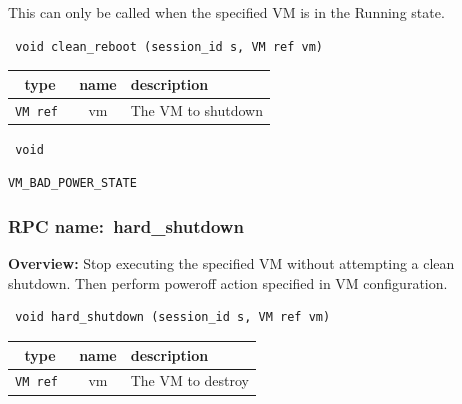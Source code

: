 This can only be called when the specified VM is in the Running state.

\begin{verbatim} void clean_reboot (session_id s, VM ref vm)\end{verbatim}



 
\vspace{0.3cm}
\begin{tabular}{|c|c|p{7cm}|}
 \hline
{\bf type} & {\bf name} & {\bf description} \\ \hline
{\tt VM ref } & vm & The VM to shutdown \\ \hline 

\end{tabular}

\vspace{0.3cm}

{\tt 
void
}



\vspace{0.3cm}

 {\tt VM\_BAD\_POWER\_STATE}

\vspace{0.6cm}
\subsubsection{RPC name:~hard\_shutdown}

{\bf Overview:} 
Stop executing the specified VM without attempting a clean shutdown. Then
perform poweroff action specified in VM configuration.

\begin{verbatim} void hard_shutdown (session_id s, VM ref vm)\end{verbatim}



 
\vspace{0.3cm}
\begin{tabular}{|c|c|p{7cm}|}
 \hline
{\bf type} & {\bf name} & {\bf description} \\ \hline
{\tt VM ref } & vm & The VM to destroy \\ \hline 

\end{tabular}

\vspace{0.3cm}

